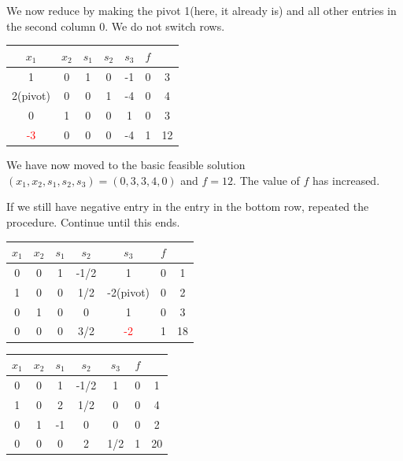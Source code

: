  We now reduce by making the pivot 1(here, it already is) and all other entries in the second column 0. We do not switch rows.

\begin{center}
    \begin{tabular}{cccccc|c}
    $x_1$ & $x_2$ & $s_1$ & $s_2$ & $s_3$ & $f$ & \\
    \hline
    1 & 0 & 1 & 0 & -1 & 0 & 3\\
    2(pivot) & 0 & 0 & 1 & -4 & 0 & 4\\
    0 & 1 & 0 & 0 & 1 & 0 & 3\\
    \hline
    \textcolor{red}{-3} & 0 & 0 & 0 & -4 & 1 & 12\\
    \hline
\end{tabular}
\end{center}

We have now moved to the basic feasible solution $(x_1, x_2, s_1, s_2, s_3) = (0, 3, 3, 4, 0)$ and $f = 12$. The value of $f$ has increased.

If we still have negative entry in the entry in the bottom row, repeated the procedure. Continue until this ends.

\begin{center}
    \begin{tabular}{cccccc|c}
    $x_1$ & $x_2$ & $s_1$ & $s_2$ & $s_3$ & $f$ & \\
    \hline
    0 & 0 & 1 & -1/2 & 1 & 0 & 1\\
    1 & 0 & 0 & 1/2 & -2(pivot) & 0 & 2\\
    0 & 1 & 0 & 0 & 1 & 0 & 3\\
    \hline
    0 & 0 & 0 & 3/2 & \textcolor{red}{-2} & 1 & 18\\
    \hline
\end{tabular}
\end{center}

\begin{center}
    \begin{tabular}{cccccc|c}
    $x_1$ & $x_2$ & $s_1$ & $s_2$ & $s_3$ & $f$ & \\
    \hline
    0 & 0 & 1 & -1/2 & 1 & 0 & 1\\
    1 & 0 & 2 & 1/2 & 0 & 0 & 4\\
    0 & 1 & -1 & 0 & 0 & 0 & 2\\
    \hline
    0 & 0 & 0 & 2 & 1/2 & 1 & 20\\
    \hline
\end{tabular}
\end{center}

